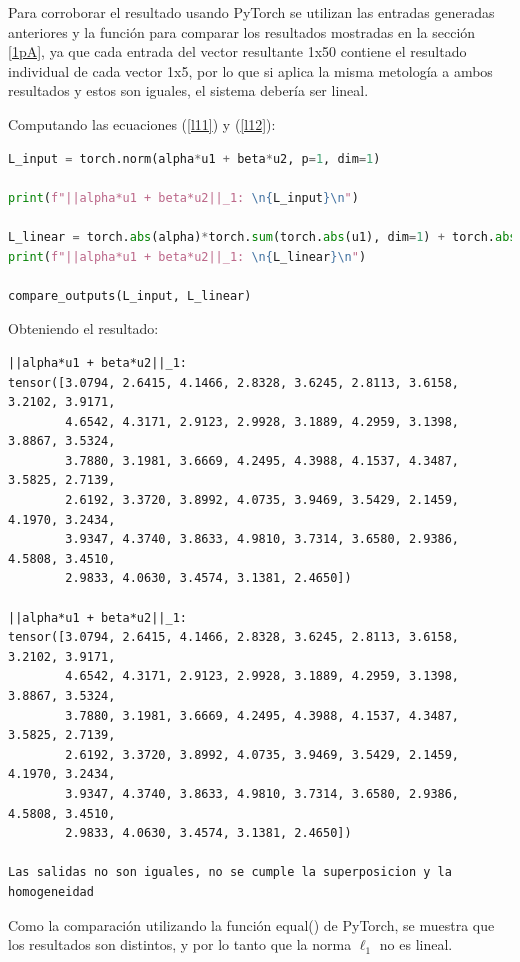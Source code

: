 \documentclass[12 pt]{article}
\begin{document}
\begin{enumerate}
Para corroborar el resultado usando PyTorch se utilizan las entradas generadas anteriores y la función para comparar los resultados mostradas en la sección \ref{1pA}, ya que cada entrada del vector resultante 1x50 contiene el resultado individual de cada vector 1x5, por lo que si aplica la misma metología a ambos resultados y estos son iguales, el sistema debería ser lineal.

Computando las ecuaciones (\ref{l11}) y (\ref{l12}):

\begin{lstlisting}[language=Python]
L_input = torch.norm(alpha*u1 + beta*u2, p=1, dim=1)

print(f"||alpha*u1 + beta*u2||_1: \n{L_input}\n")

L_linear = torch.abs(alpha)*torch.sum(torch.abs(u1), dim=1) + torch.abs(beta)*torch.sum(torch.abs(u2), dim=1)
print(f"||alpha*u1 + beta*u2||_1: \n{L_linear}\n")

compare_outputs(L_input, L_linear)
\end{lstlisting}

Obteniendo el resultado:

\begin{lstlisting}
||alpha*u1 + beta*u2||_1: 
tensor([3.0794, 2.6415, 4.1466, 2.8328, 3.6245, 2.8113, 3.6158, 3.2102, 3.9171,
        4.6542, 4.3171, 2.9123, 2.9928, 3.1889, 4.2959, 3.1398, 3.8867, 3.5324,
        3.7880, 3.1981, 3.6669, 4.2495, 4.3988, 4.1537, 4.3487, 3.5825, 2.7139,
        2.6192, 3.3720, 3.8992, 4.0735, 3.9469, 3.5429, 2.1459, 4.1970, 3.2434,
        3.9347, 4.3740, 3.8633, 4.9810, 3.7314, 3.6580, 2.9386, 4.5808, 3.4510,
        2.9833, 4.0630, 3.4574, 3.1381, 2.4650])

||alpha*u1 + beta*u2||_1: 
tensor([3.0794, 2.6415, 4.1466, 2.8328, 3.6245, 2.8113, 3.6158, 3.2102, 3.9171,
        4.6542, 4.3171, 2.9123, 2.9928, 3.1889, 4.2959, 3.1398, 3.8867, 3.5324,
        3.7880, 3.1981, 3.6669, 4.2495, 4.3988, 4.1537, 4.3487, 3.5825, 2.7139,
        2.6192, 3.3720, 3.8992, 4.0735, 3.9469, 3.5429, 2.1459, 4.1970, 3.2434,
        3.9347, 4.3740, 3.8633, 4.9810, 3.7314, 3.6580, 2.9386, 4.5808, 3.4510,
        2.9833, 4.0630, 3.4574, 3.1381, 2.4650])

Las salidas no son iguales, no se cumple la superposicion y la homogeneidad
\end{lstlisting}

Como la comparación utilizando la función equal() de PyTorch, se muestra que los resultados son distintos, y por lo tanto que la norma ${\ell_{1}}$ no es lineal.


\end{enumerate}
\end{document}
